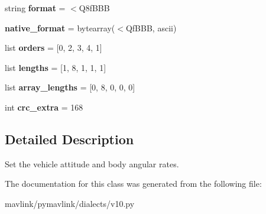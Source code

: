 \begin{DoxyCompactItemize}
string {\bfseries format} = \textquotesingle{}$<$Q8f\+B\+BB\textquotesingle{}
\item 
\mbox{\label{classpymavlink_1_1dialects_1_1v10_1_1MAVLink__set__actuator__control__target__message_a382619de8776caba0660149221fb7db0}} 
{\bfseries native\+\_\+format} = bytearray(\textquotesingle{}$<$Qf\+B\+BB\textquotesingle{}, \textquotesingle{}ascii\textquotesingle{})
\item 
\mbox{\label{classpymavlink_1_1dialects_1_1v10_1_1MAVLink__set__actuator__control__target__message_a37c67a57c0a3fe4b1c4558a9b460d448}} 
list {\bfseries orders} = \mbox{[}0, 2, 3, 4, 1\mbox{]}
\item 
\mbox{\label{classpymavlink_1_1dialects_1_1v10_1_1MAVLink__set__actuator__control__target__message_a89f9b115dd61bfc5d6235d94655af44b}} 
list {\bfseries lengths} = \mbox{[}1, 8, 1, 1, 1\mbox{]}
\item 
\mbox{\label{classpymavlink_1_1dialects_1_1v10_1_1MAVLink__set__actuator__control__target__message_a6920c7bca8fb667e31435df695ea35a9}} 
list {\bfseries array\+\_\+lengths} = \mbox{[}0, 8, 0, 0, 0\mbox{]}
\item 
\mbox{\label{classpymavlink_1_1dialects_1_1v10_1_1MAVLink__set__actuator__control__target__message_a14da12be0873a88c6f8ea273ef85eec1}} 
int {\bfseries crc\+\_\+extra} = 168
\end{DoxyCompactItemize}


\subsection{Detailed Description}
\begin{DoxyVerb}Set the vehicle attitude and body angular rates.
\end{DoxyVerb}
 

The documentation for this class was generated from the following file\+:\begin{DoxyCompactItemize}
\item 
mavlink/pymavlink/dialects/v10.\+py\end{DoxyCompactItemize}
